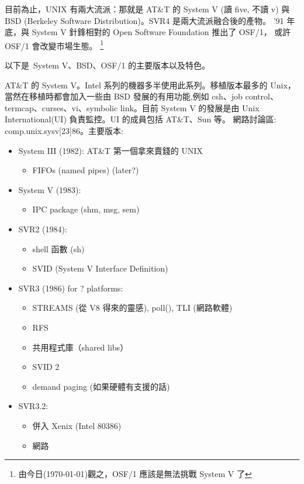 \documentclass{article}
\begin{document}
\begin{CJK*}{Bg5}{ming}
    目前為止，UNIX 有兩大流派：那就是 AT\&T 的 System V (讀 five, 不讀 v)
    與 BSD (Berkeley Software Distribution)。SVR4 是兩大流派融合後的產物。
    '91 年底，與 System V 針鋒相對的 Open Software Foundation 推出了 OSF/1，
    或許 OSF/1 會改變市場生態。
    \footnote{由今日(\today)觀之，OSF/1 應該是無法挑戰 System V 了}

    以下是~System V、BSD、OSF/1 的主要版本以及特色。
    
    AT\&T 的 System V。Intel 系列的機器多半使用此系列。移植版本最多的 Unix，
    當然在移植時都會加入一些由 BSD 發展的有用功能,例如 csh、job control、
    termcap、curses、vi、symbolic link。目前 System V 的發展是由 Unix
    International(UI) 負責監控。UI 的成員包括 AT\&T、Sun 等。
    網路討論區: comp.unix.sysv[23]86。主要版本:
\begin{itemize}
         \item  System III (1982): AT\&T 第一個拿來賣錢的 UNIX
	 \begin{itemize}
           \item FIFOs (named pipes)  (later?)
	 \end{itemize}

         \item System V (1983):
	 \begin{itemize}
           \item IPC package (shm, msg, sem)
	 \end{itemize}

         \item SVR2 (1984):
	 \begin{itemize}
           \item shell 函數 (sh)
           \item SVID (System V Interface Definition)
	 \end{itemize}

         \item SVR3 (1986) for ? platforms:
	 \begin{itemize}
           \item STREAMS (從 V8 得來的靈感), poll(), TLI (網路軟體)
           \item RFS
           \item 共用程式庫（shared libs）
           \item SVID 2
           \item demand paging (如果硬體有支援的話)
	 \end{itemize}

         \item SVR3.2:
	 \begin{itemize}
           \item 併入 Xenix (Intel 80386)
           \item 網路
	 \end{itemize}


\end{itemize}
\end{CJK*}
\end{document}
